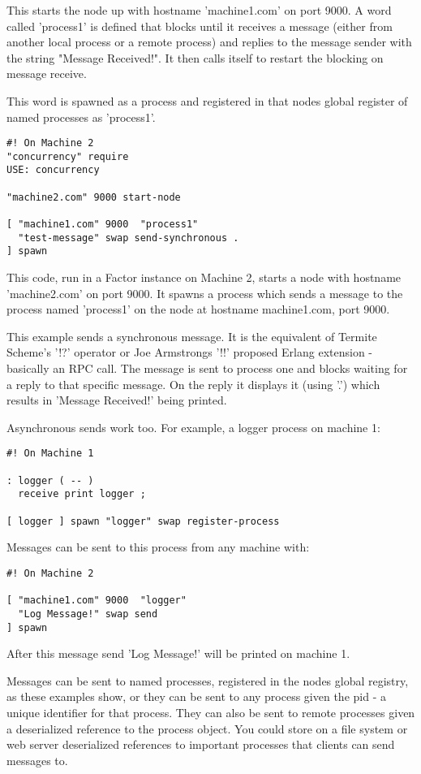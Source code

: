 This starts the node up with hostname 'machine1.com' on port 9000. A
word called 'process1' is defined that blocks until it receives a
message (either from another local process or a remote process) and
replies to the message sender with the string "Message Received!". It
then calls itself to restart the blocking on message receive.

This word is spawned as a process and registered in that nodes global
 register of named processes as 'process1'.

\begin{verbatim}
#! On Machine 2
"concurrency" require
USE: concurrency

"machine2.com" 9000 start-node

[ "machine1.com" 9000  "process1"  
  "test-message" swap send-synchronous .
] spawn
\end{verbatim}


This code, run in a Factor instance on Machine 2, starts a node with
hostname 'machine2.com' on port 9000. It spawns a process which sends
a message to the process named 'process1' on the node at hostname
machine1.com, port 9000.

This example sends a synchronous message. It is the equivalent of
Termite Scheme's '!?' operator or Joe Armstrongs '!!' proposed Erlang
extension - basically an RPC call. The message is sent to process one
and blocks waiting for a reply to that specific message. On the reply
it displays it (using '.') which results in 'Message Received!' being
printed.

Asynchronous sends work too. For example, a logger process on machine 1:

\begin{verbatim}
#! On Machine 1

: logger ( -- )
  receive print logger ;

[ logger ] spawn "logger" swap register-process
\end{verbatim}


Messages can be sent to this process from any machine with:

\begin{verbatim}
#! On Machine 2

[ "machine1.com" 9000  "logger"  
  "Log Message!" swap send
] spawn

\end{verbatim}

After this message send 'Log Message!' will be printed on machine 1.

Messages can be sent to named processes, registered in the nodes
global registry, as these examples show, or they can be sent to any
process given the pid - a unique identifier for that process. They can
also be sent to remote processes given a deserialized reference to the
process object. You could store on a file system or web server
deserialized references to important processes that clients can send
messages to.

